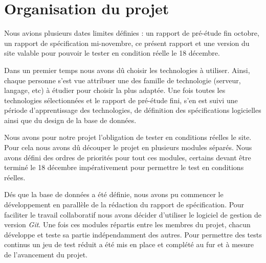 \chapter{Organisation du projet}

Nous avions plusieurs dates limites définies : un rapport de pré-étude fin octobre, un rapport de spécification mi-novembre, ce présent rapport et une version du site valable pour pouvoir le tester en condition réelle le 18 décembre.

Dans un premier temps nous avons dû choisir les technologies à utiliser. Ainsi, chaque personne s'est vue attribuer une des famille de technologie (serveur, langage, etc) à étudier pour choisir la plus adaptée.
Une fois toutes les technologies sélectionnées et le rapport de pré-étude fini, s'en est suivi une période d'apprentissage des technologies, de définition des spécifications logicielles ainsi que du design de la base de données.

\bigbreak

Nous avons pour notre projet l'obligation de tester en conditions réelles le site. Pour cela nous avons dû découper le projet en plusieurs modules séparés. Nous avons défini des ordres de priorités pour tout ces modules, certains devant être terminé le 18 décembre impérativement pour permettre le test en conditions réelles.

Dés que la base de données a été définie, nous avons pu commencer le développement en parallèle de la rédaction du rapport de spécification. Pour faciliter le travail collaboratif nous avons décider d'utiliser le logiciel de gestion de version \textit{Git}.
Une fois ces modules répartis entre les membres du projet, chacun développe et teste sa partie indépendamment des autres.
Pour permettre des tests continus un jeu de test réduit a été mis en place et complété au fur et à mesure de l'avancement du projet.
